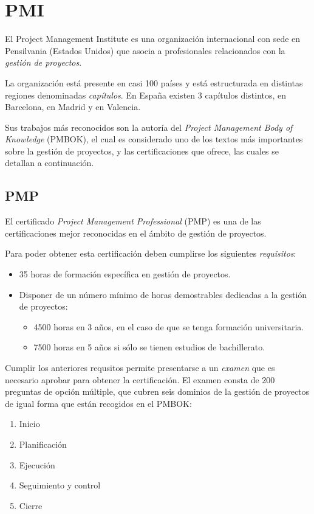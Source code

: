 \section{PMI}

El Project Management Institute es una organización internacional con sede en Pensilvania (Estados Unidos) que asocia a profesionales relacionados con la \emph{gestión de proyectos}.

La organización está presente en casi 100 países y está estructurada en distintas regiones denominadas \emph{capítulos}. En España existen 3 capítulos distintos, en Barcelona, en Madrid y en Valencia.

Sus trabajos más reconocidos son la autoría del \emph{Project Management Body of Knowledge} (PMBOK), el cual es considerado uno de los textos más importantes sobre la gestión de proyectos, y las certificaciones que ofrece, las cuales se detallan a continuación.

\subsection{PMP}

El certificado \emph{Project Management Professional} (PMP) es una de las certificaciones mejor reconocidas en el ámbito de gestión de proyectos.

Para poder obtener esta certificación deben cumplirse los siguientes \emph{requisitos}:

\begin{itemize}
\item 35 horas de formación específica en gestión de proyectos.
\item Disponer de un número mínimo de horas demostrables dedicadas a la gestión de proyectos:
	\begin{itemize}
	\item 4500 horas en 3 años, en el caso de que se tenga formación universitaria.
	\item 7500 horas en 5 años si sólo se tienen estudios de bachillerato.
	\end{itemize} 
\end{itemize}

Cumplir los anteriores requsitos permite presentarse a un \emph{examen} que es necesario aprobar para obtener la certificación. El examen consta de 200 preguntas de opción múltiple, que cubren seis dominios de la gestión de proyectos de igual forma que están recogidos en el PMBOK:

\begin{enumerate}
\item Inicio
\item Planificación
\item Ejecución
\item Seguimiento y control
\item Cierre
\end{enumerate}

